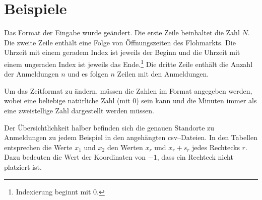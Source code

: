 \newpage
\section{Beispiele}
Das Format der Eingabe wurde geändert. 
Die erste Zeile beinhaltet die Zahl $N$.
Die zweite Zeile enthält eine Folge von Öffnungszeiten des Flohmarkts.
Die Uhrzeit mit einem geradem Index ist jeweils der Beginn und die Uhrzeit 
mit einem ungeraden Index ist jeweils das Ende.\footnote{Indexierung beginnt mit 0.}
Die dritte Zeile enthält die Anzahl der Anmeldungen $n$ und es folgen $n$ Zeilen mit den Anmeldungen.

Um das Zeitformat zu ändern, müssen die Zahlen im Format  angegeben werden, wobei
 eine beliebige natürliche Zahl (mit 0) sein kann und
die Minuten  immer als eine zweistellige Zahl dargestellt werden müssen.

Der Übersichtlichkeit halber befinden sich die genauen Standorte zu Anmeldungen
zu jedem Beispiel in den angehängten csv--Dateien.
In den Tabellen entsprechen die Werte $x_1$ und $x_2$ den Werten 
$x_r$ und $x_r + s_r$ jedes Rechtecks $r$.
Dazu bedeuten die Wert der Koordinaten von $-1$, dass ein Rechteck nicht platziert ist.












